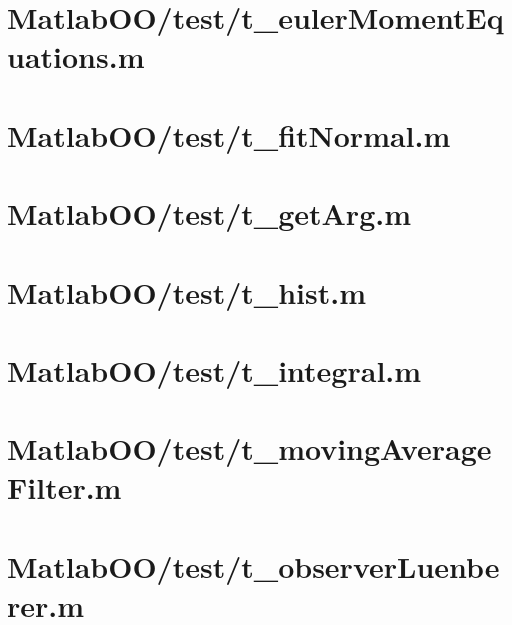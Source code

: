 \pagebreak
\section{MatlabOO/test/t\_eulerMomentEquations.m}\label{code:MatlabOO/test/t_eulerMomentEquations.m}


\pagebreak
\section{MatlabOO/test/t\_fitNormal.m}\label{code:MatlabOO/test/t_fitNormal.m}


\pagebreak
\section{MatlabOO/test/t\_getArg.m}\label{code:MatlabOO/test/t_getArg.m}


\pagebreak
\section{MatlabOO/test/t\_hist.m}\label{code:MatlabOO/test/t_hist.m}


\pagebreak
\section{MatlabOO/test/t\_integral.m}\label{code:MatlabOO/test/t_integral.m}


\pagebreak
\section{MatlabOO/test/t\_movingAverageFilter.m}\label{code:MatlabOO/test/t_movingAverageFilter.m}


\pagebreak
\section{MatlabOO/test/t\_observerLuenberer.m}\label{code:MatlabOO/test/t_observerLuenberer.m}


